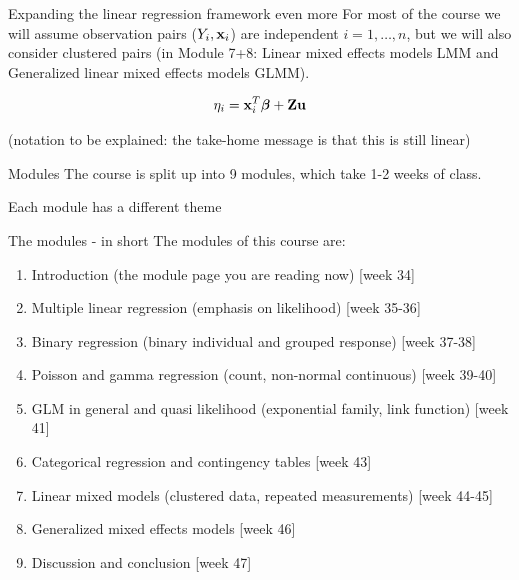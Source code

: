 \documentclass[
  ignorenonframetext,
]{beamer}
\begin{document}
\begin{frame}
\begin{block}{Expanding the linear regression framework even more}
\label{expanding-the-linear-regression-framework-even-more}
For most of the course we will assume observation pairs
(\(Y_i,{\bf x}_i\)) are independent \(i=1,\ldots,n\), but we will also
consider clustered pairs (in Module 7+8: Linear mixed effects models LMM
and Generalized linear mixed effects models GLMM).

\[
\eta_i={\bf x}_i^T \boldsymbol{\beta} + \bf{Z} u
\]

(notation to be explained: the take-home message is that this is still
linear)
\end{block}
\end{frame}

\begin{frame}
\begin{block}{Modules}
\label{modules}
The course is split up into 9 modules, which take 1-2 weeks of class.

Each module has a different theme
\end{block}
\end{frame}

\begin{frame}
\begin{block}{The modules - in short}
\label{the-modules---in-short}
The modules of this course are:

\begin{enumerate}
\item
  Introduction (the module page you are reading now) {[}week 34{]}
\item
  Multiple linear regression (emphasis on likelihood) {[}week 35-36{]}
\item
  Binary regression (binary individual and grouped response) {[}week
  37-38{]}
\item
  Poisson and gamma regression (count, non-normal continuous) {[}week
  39-40{]}
\item
  GLM in general and quasi likelihood (exponential family, link
  function) {[}week 41{]}
\item
  Categorical regression and contingency tables {[}week 43{]}
\item
  Linear mixed models (clustered data, repeated measurements) {[}week
  44-45{]}
\item
  Generalized mixed effects models {[}week 46{]}
\item
  Discussion and conclusion {[}week 47{]}
\end{enumerate}
\end{block}
\end{frame}
\end{document}
